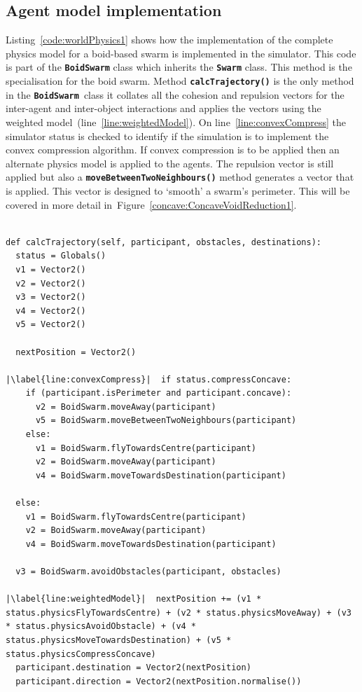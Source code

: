 \subsection{Agent model implementation}
Listing~\ref{code:worldPhysics1} shows how the implementation of the complete physics model for a boid-based swarm is implemented in the simulator. This code is part of the \texttt{\textbf{BoidSwarm}} class which inherits the \texttt{\textbf{Swarm}} class. This method is the specialisation for the boid swarm. Method \texttt{\textbf{calcTrajectory()}} is the only method in the \texttt{\textbf{BoidSwarm}}~class it collates all the cohesion and repulsion vectors for the inter-agent and inter-object interactions and applies the vectors using the weighted model~(line~\ref{line:weightedModel}). On line~\ref{line:convexCompress} the simulator status is checked to identify if the simulation is to implement the convex compression algorithm. If convex compression is to be applied then an alternate physics model is applied to the agents. The repulsion vector is still applied but also a \texttt{\textbf{moveBetweenTwoNeighbours()}} method generates a vector that is applied. This vector is designed to `smooth' a swarm's perimeter. This will be covered in more detail in~Figure~\ref{concave:ConcaveVoidReduction1}.

\lstset{language=Python,
basicstyle=\tiny,
numbers=left, 
numberstyle=\tiny,
captionpos=b,
frame=single,
breaklines=true,
caption=Agent trajectory code,
escapechar=|
} %
\begin{lstlisting}[label={code:worldPhysics1}]  % Start your code-block

def calcTrajectory(self, participant, obstacles, destinations):
  status = Globals()
  v1 = Vector2()
  v2 = Vector2()
  v3 = Vector2()
  v4 = Vector2()
  v5 = Vector2()

  nextPosition = Vector2()
        
|\label{line:convexCompress}|  if status.compressConcave:
    if (participant.isPerimeter and participant.concave):
      v2 = BoidSwarm.moveAway(participant)
      v5 = BoidSwarm.moveBetweenTwoNeighbours(participant)
    else:
      v1 = BoidSwarm.flyTowardsCentre(participant)
      v2 = BoidSwarm.moveAway(participant)
      v4 = BoidSwarm.moveTowardsDestination(participant)

  else:
    v1 = BoidSwarm.flyTowardsCentre(participant)            
    v2 = BoidSwarm.moveAway(participant)
    v4 = BoidSwarm.moveTowardsDestination(participant)

  v3 = BoidSwarm.avoidObstacles(participant, obstacles)

|\label{line:weightedModel}|  nextPosition += (v1 * status.physicsFlyTowardsCentre) + (v2 * status.physicsMoveAway) + (v3 * status.physicsAvoidObstacle) + (v4 * status.physicsMoveTowardsDestination) + (v5 * status.physicsCompressConcave)
  participant.destination = Vector2(nextPosition)
  participant.direction = Vector2(nextPosition.normalise())
\end{lstlisting}

